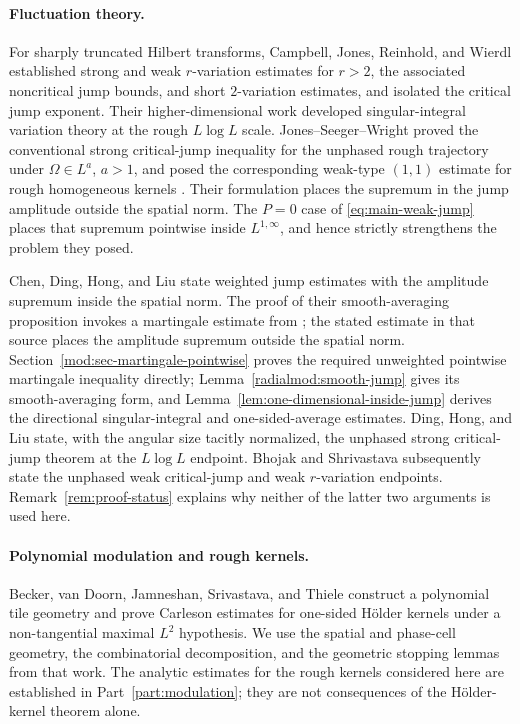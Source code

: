 \documentclass[11pt]{article}
\numberwithin{equation}{section}
\theoremstyle{remark}
\theoremstyle{definition}
\begin{document}
\paragraph{Fluctuation theory.}
For sharply truncated Hilbert transforms,
Campbell, Jones, Reinhold, and Wierdl
\cite[Theorems~1.2--1.4 and Conjecture~7.2]{CJRW} established strong and
weak $r$-variation estimates for $r>2$, the associated noncritical jump
bounds, and short $2$-variation estimates, and isolated the critical jump
exponent.  Their higher-dimensional work \cite{CJRW03} developed
singular-integral variation theory at the rough $L\log L$ scale.
Jones--Seeger--Wright \cite[Theorem~1.6]{JSW} proved the conventional
strong critical-jump inequality for the unphased rough trajectory under
$\Omega\in L^a$, $a>1$, and posed the corresponding weak-type $(1,1)$
estimate for rough homogeneous kernels \cite{JSW}.  Their formulation
places the supremum in the jump amplitude outside the spatial norm.  The
$P=0$ case of \eqref{eq:main-weak-jump} places that supremum pointwise
inside $L^{1,\infty}$, and hence strictly strengthens the problem they
posed.

Chen, Ding, Hong, and Liu \cite{ChenDingHongLiu} state weighted
jump estimates with the amplitude supremum inside the spatial norm.
The proof of their smooth-averaging proposition invokes a martingale
estimate from \cite{KrauseZorinKranich}; the stated estimate in that
source places the amplitude supremum outside the spatial norm. Section~\ref{mod:sec-martingale-pointwise} proves the required
unweighted pointwise martingale inequality directly;
Lemma~\ref{radialmod:smooth-jump} gives its smooth-averaging form, and
Lemma~\ref{lem:one-dimensional-inside-jump} derives the directional
singular-integral and one-sided-average estimates.
  Ding, Hong, and Liu
\cite[Theorem~1.2(ii)]{DHL} state, with the angular size tacitly
normalized, the unphased strong critical-jump theorem at the $L\log L$
endpoint.  Bhojak and Shrivastava
\cite[Theorem~1.1]{BhojakShrivastava} subsequently state the unphased weak
critical-jump and weak $r$-variation endpoints.
Remark~\ref{rem:proof-status} explains why neither of the latter two
arguments is used here.

\paragraph{Polynomial modulation and rough kernels.}
Becker, van Doorn, Jamneshan, Srivastava, and Thiele \cite{BDJST}
construct a polynomial tile geometry and prove Carleson estimates for
one-sided H\"older kernels under a non-tangential maximal $L^2$ hypothesis.
We use the spatial and phase-cell geometry, the combinatorial
decomposition, and the geometric stopping lemmas from that work. The
analytic estimates for the rough kernels considered here are established
in Part~\ref{part:modulation}; they are not consequences of the
H\"older-kernel theorem alone.
\end{document}
